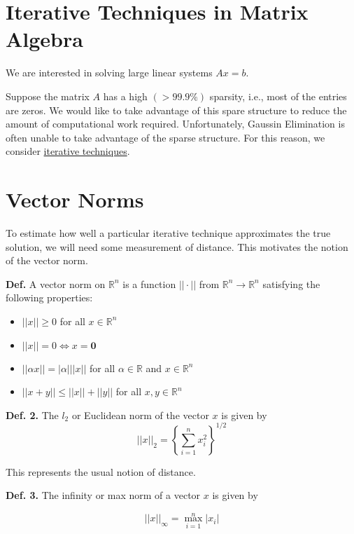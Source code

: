 \renewcommand{\arraystretch}{1.25} %
\setlength{\arraycolsep}{12pt}

\section{Iterative Techniques in Matrix Algebra}

We are interested in solving large linear systems $Ax=b$.

Suppose the matrix $A$ has a high $(>99.9\%)$ sparsity, i.e., most of the
entries are zeros. We would like to take advantage of this spare structure to
reduce the amount of computational work required. Unfortunately, Gaussin
Elimination is often unable to take advantage of the sparse structure. For this
reason, we consider \uline{iterative techniques}.

\section{Vector Norms}

To estimate how well a particular iterative technique approximates
the true solution, we will need some measurement of distance. This motivates
the notion of the vector norm.

\textbf{Def.} A vector norm on $\mathbb{R}^n$ is a function $||\cdot||$ from
$\mathbb{R}^n \to \mathbb{R}^n $ satisfying the following properties:

\begin{itemize}
  \item $||x|| \geq 0$ for all $x \in \mathbb{R}^n$
  \item $||x|| = 0 \iff x = \mathbf{0}$
  \item $||\alpha x|| = |\alpha| ||x||$ for all $\alpha \in \mathbb{R}$ and
    $x \in \mathbb{R}^n$
  \item $||x+y|| \leq ||x|| + ||y|| $ for all $x,y \in \mathbb{R}^n$
\end{itemize}

\textbf{Def. 2.} The $l_2$ or Euclidean norm of the vector $x$ is given by
\begin{equation*}
  ||x||_2 = \left\{ \sum_{i = 1}^{n}  x_i^2 \right\}^{1/2}
\end{equation*}

This represents the usual notion of distance.

\textbf{Def. 3.} The infinity or max norm of a vector $x$ is given by

\begin{equation*}
  ||x||_\infty = \max_{i=1}^n |x_i|
\end{equation*}

